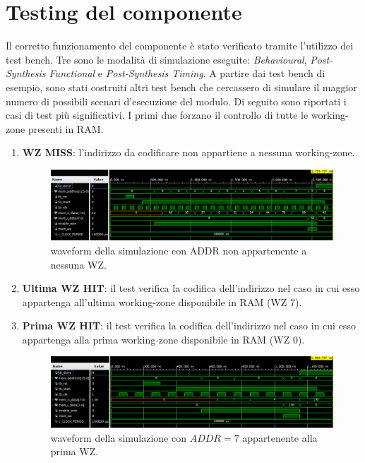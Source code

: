 \section{Testing del componente}
Il corretto funzionamento del componente è stato verificato tramite l'utilizzo dei test bench. Tre sono le modalità di simulazione eseguite: \textit{Behavioural}, \textit{Post-Synthesis Functional} e \textit{Post-Synthesis Timing}.\newline
A partire dai test bench di esempio, sono stati costruiti altri test bench che cercassero di simulare il maggior numero di possibili scenari d'esecuzione del modulo.\newline
Di seguito sono riportati i casi di test più significativi. I primi due forzano il controllo di tutte le working-zone presenti in RAM.

\begin{enumerate}

	\item \textbf{WZ MISS}: l'indirizzo da codificare non appartiene a nessuna working-zone.
	\begin{figure}[!htb]
		\centering
		\includegraphics[scale=0.520]{images/wz_miss.png}
		\caption{waveform della simulazione con ADDR non appartenente a nessuna WZ.}
	\end{figure}
		
	\item \textbf{Ultima WZ HIT}: il test verifica la codifica dell'indirizzo nel caso in cui esso appartenga all'ultima working-zone disponibile in RAM (WZ 7).
	
	\item \textbf{Prima WZ HIT}: il test verifica la codifica dell'indirizzo nel caso in cui esso appartenga alla prima working-zone disponibile in RAM (WZ 0).
	\begin{figure}[!htb]
		\centering
		\includegraphics[scale=0.520]{images/first_wz_hit.png}
		\caption{waveform della simulazione con $ADDR=7$ appartenente alla prima WZ.}	
	\end{figure}

\end{enumerate}	

